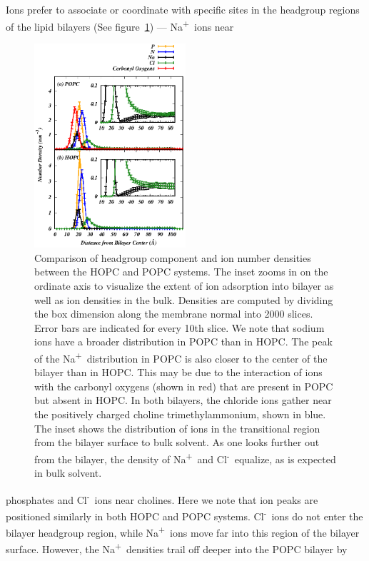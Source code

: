 \documentclass[12pt,openany,final]{book}
\newcommand{\na}{Na\textsuperscript{+}~}
\newcommand{\cl}{Cl\textsuperscript{-}~}
\begin{document}
Ions prefer to associate or coordinate with specific sites 
in the headgroup regions of the lipid bilayers (See figure~\ref{fig:numberdens}) --- \na ions near 
\begin{figure}[p]
    \caption[Comparison of headgroup component and ion number densities between the HOPC and POPC systems.]{ 
Comparison of headgroup component and ion number densities between the HOPC and POPC systems. The 
inset zooms in on the ordinate axis to visualize the extent of ion 
adsorption into bilayer as well as ion densities in the bulk. Densities are computed by dividing 
the box dimension along the membrane normal into 2000 slices. Error bars are indicated for every 10th slice. 
We note that sodium ions have a broader distribution in POPC than in HOPC. The peak of the \na distribution in 
POPC is also closer to the center of the bilayer than in HOPC. This may be due 
to the interaction of ions with the carbonyl oxygens (shown in red) 
that are present in POPC but absent in HOPC. In both bilayers, the chloride ions 
gather near the positively charged choline trimethylammonium, shown in blue. The 
inset shows the distribution of ions in the transitional region from the bilayer surface to bulk solvent. As one 
looks further out from the bilayer, the density of \na and \cl equalize, as is expected in bulk solvent. 
}
\label{fig:numberdens}
\includegraphics[width=	0.5\textwidth]{density.eps}
\end{figure}
phosphates and \cl ions near cholines. Here we note that ion peaks are positioned similarly in both HOPC and 
POPC systems. \cl ions do not enter the bilayer headgroup region, while \na ions move far into this region
of the bilayer surface. However, the \na densities trail off deeper into the POPC bilayer by 
\end{document}
